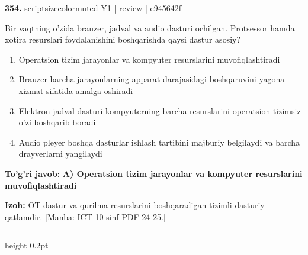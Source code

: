 \documentclass[10pt,a4paper]{article}
\begin{document}
{\bfseries\sffamily\color{ink} 354.} {scriptsizecolor{muted} Y1 | review | e945642f}
\par
Bir vaqtning o'zida brauzer, jadval va audio dasturi ochilgan. Protsessor hamda xotira resurslari foydalanishini boshqarishda qaysi dastur asosiy?
\begin{enumerate}[label=\Alph*),leftmargin=9mm]
\item Operatsion tizim jarayonlar va kompyuter resurslarini muvofiqlashtiradi
\item Brauzer barcha jarayonlarning apparat darajasidagi boshqaruvini yagona xizmat sifatida amalga oshiradi
\item Elektron jadval dasturi kompyuterning barcha resurslarini operatsion tizimsiz o'zi boshqarib boradi
\item Audio pleyer boshqa dasturlar ishlash tartibini majburiy belgilaydi va barcha drayverlarni yangilaydi
\end{enumerate}
\begin{tcolorbox}[enhanced,breakable,colback=teal!4,colframe=teal!60!black,boxrule=0.45pt,arc=1.2mm,left=2.7mm,right=2.7mm,top=1.8mm,bottom=1.8mm,before skip=2mm,after skip=2mm]
{\bfseries\sffamily\color{teal}To'g'ri javob:} \textbf{A) Operatsion tizim jarayonlar va kompyuter resurslarini muvofiqlashtiradi}
\par\smallskip
{\bfseries Izoh:} OT dastur va qurilma resurslarini boshqaradigan tizimli dasturiy qatlamdir. [Manba: ICT 10-sinf PDF 24-25.]
\end{tcolorbox}
\vspace{2mm}\hrule height 0.2pt\vspace{3mm}
\end{document}
